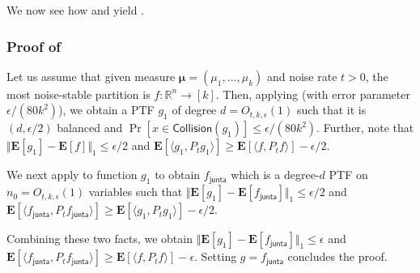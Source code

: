 \documentclass{toc}
\newcommand{\fh}{{f_{\mathsf{junta}}}}
\begin{document}
We now see how  and  yield . 
\subsubsection*{Proof of } 
Let us  assume that given measure $\boldsymbol{\mu} = (\mu_1, \ldots, \mu_k)$ and noise rate $t>0$, the most
%
noise-stable    %
partition is $f: \mathbb{R}^n \rightarrow [k]$. Then, applying  (with error parameter $\epsilon/(80k^2)$), we obtain a PTF $g_1$ of degree $d = O_{t, k,\epsilon}(1)$ such that it is $(d,\epsilon/2)$ balanced and $\Pr[x \in \mathsf{Collision}(g_1)]\le \epsilon/(80k^2)$. Further, note that $\Vert \mathbf{E}[g_1] - \mathbf{E}[f] \Vert_1 \le \epsilon/2$ and $\mathbf{E}[\langle g_1, P_t g_1 \rangle] \ge\mathbf{E}[ \langle f, P_t f \rangle] - \epsilon/2$. 

We next apply  to function $g_1$ to obtain $\fh$ which is a degree-$d$ PTF on $n_0 = O_{t,k, \epsilon}(1)$ variables such that $\Vert \mathbf{E}[g_1] - \mathbf{E}[\fh] \Vert_1 \le \epsilon/2$ and 
$\mathbf{E}[\langle \fh, P_t \fh \rangle] \ge \mathbf{E}[\langle g_1, P_t g_1 \rangle] - \epsilon/2$. 

Combining these two facts, we obtain $\Vert \mathbf{E}[g_1] - \mathbf{E}[\fh] \Vert_1 \le \epsilon$ and 
$\mathbf{E}[\langle \fh, P_t \fh \rangle] \ge \mathbf{E}[\langle f, P_t f \rangle] - \epsilon$. Setting $g = \fh$ concludes the proof. 
\end{document}
